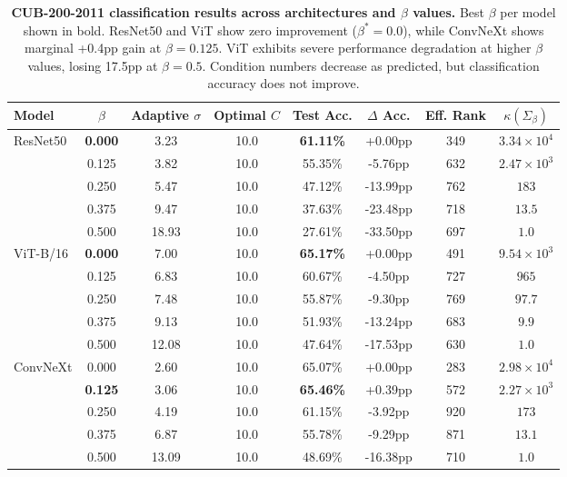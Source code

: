 \documentclass[11pt]{article}
\begin{document}
\begin{table}[h]
\centering
\caption{\textbf{CUB-200-2011 classification results across architectures and $\beta$ values.} Best $\beta$ per model shown in bold. ResNet50 and ViT show zero improvement ($\beta^* = 0.0$), while ConvNeXt shows marginal +0.4pp gain at $\beta=0.125$. ViT exhibits severe performance degradation at higher $\beta$ values, losing 17.5pp at $\beta=0.5$. Condition numbers decrease as predicted, but classification accuracy does not improve.}
\label{tab:cub_results}
\begin{tabular}{lccccccc}
\toprule
Model & $\beta$ & Adaptive $\sigma$ & Optimal $C$ & Test Acc. & $\Delta$ Acc. & Eff. Rank & $\kappa(\Sigma_\beta)$ \\
\midrule
\multirow{5}{*}{ResNet50} & \textbf{0.000} & 3.23 & 10.0 & \textbf{61.11\%} & +0.00pp & 349 & $3.34 \times 10^4$ \\
& 0.125 & 3.82 & 10.0 & 55.35\% & -5.76pp & 632 & $2.47 \times 10^3$ \\
& 0.250 & 5.47 & 10.0 & 47.12\% & -13.99pp & 762 & $183$ \\
& 0.375 & 9.47 & 10.0 & 37.63\% & -23.48pp & 718 & $13.5$ \\
& 0.500 & 18.93 & 10.0 & 27.61\% & -33.50pp & 697 & $1.0$ \\
\midrule
\multirow{5}{*}{ViT-B/16} & \textbf{0.000} & 7.00 & 10.0 & \textbf{65.17\%} & +0.00pp & 491 & $9.54 \times 10^3$ \\
& 0.125 & 6.83 & 10.0 & 60.67\% & -4.50pp & 727 & $965$ \\
& 0.250 & 7.48 & 10.0 & 55.87\% & -9.30pp & 769 & $97.7$ \\
& 0.375 & 9.13 & 10.0 & 51.93\% & -13.24pp & 683 & $9.9$ \\
& 0.500 & 12.08 & 10.0 & 47.64\% & -17.53pp & 630 & $1.0$ \\
\midrule
\multirow{5}{*}{ConvNeXt} & 0.000 & 2.60 & 10.0 & 65.07\% & +0.00pp & 283 & $2.98 \times 10^4$ \\
& \textbf{0.125} & 3.06 & 10.0 & \textbf{65.46\%} & +0.39pp & 572 & $2.27 \times 10^3$ \\
& 0.250 & 4.19 & 10.0 & 61.15\% & -3.92pp & 920 & $173$ \\
& 0.375 & 6.87 & 10.0 & 55.78\% & -9.29pp & 871 & $13.1$ \\
& 0.500 & 13.09 & 10.0 & 48.69\% & -16.38pp & 710 & $1.0$ \\
\bottomrule
\end{tabular}
\end{table}
\end{document}
